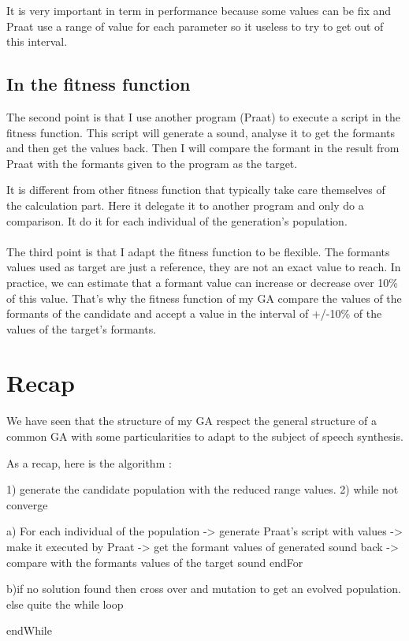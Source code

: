 \documentclass[12pt]{report}
\begin{document}
It is very important in term in performance because some values can be fix and Praat use a range of value for each parameter so it useless to try to get out of this interval.

\subsection{In the fitness function}
The second point is that I use another program (Praat) to execute a script in the fitness function. This script will generate a sound, analyse it to get the formants and then get the values back. Then I will compare the formant in the result from Praat with the formants given to the program as the target.

It is different from other fitness function that typically take care themselves of the calculation part. Here it delegate it to another program and only do a comparison.
It do it for each individual of the generation's population.

\paragraph*{}
The third point is that I adapt the fitness function to be flexible. The formants values used as target are just a reference, they are not an exact value to reach. In practice, we can estimate that a formant value can increase or decrease over 10\% of this value. That's why the fitness function of my GA compare the values of the formants of the candidate and accept a value in the interval of +/-10\% of the values of the target's formants.

\section{Recap}
We have seen that the structure of my GA respect the general structure of a common GA with some particularities to adapt to the subject of speech synthesis.

As a recap, here is the algorithm :


\begin{verbatimtab}[3]
1) generate the candidate population with the reduced range values.
2) while not converge{
		a) For each individual of the population{
					-> generate Praat's script with values 
					-> make it executed by Praat
					-> get the formant values of generated sound back
					-> compare with the formants values of the target sound	   
		   }endFor
		   
		b)if no solution found then{ 
				cross over and mutation to get an evolved population.
			}else{
				 quite the while loop  	 
			}   
		
   }endWhile

\end{verbatimtab}
\end{document}
